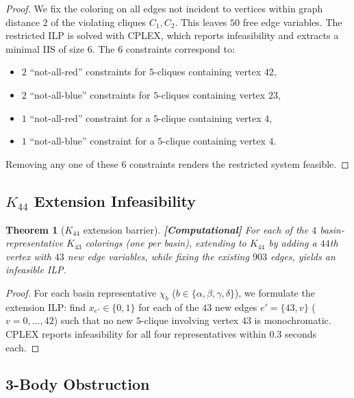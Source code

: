 \documentclass[12pt,a4paper]{article}
\newcommand{\computational}[1]{\textcolor{computational}{\textbf{[Computational]}} #1}
\newtheorem{theorem}{Theorem}[section]
\theoremstyle{definition}
\theoremstyle{remark}
\newcommand{\Kn}[1]{K_{#1}}
\begin{document}
\begin{proof}
We fix the coloring on all edges not incident to vertices within graph distance $2$ of the violating cliques $C_1, C_2$.  This leaves $50$ free edge variables.  The restricted ILP is solved with CPLEX, which reports infeasibility and extracts a minimal IIS of size $6$.  The $6$ constraints correspond to:
\begin{itemize}[nosep]
    \item $2$ ``not-all-red'' constraints for $5$-cliques containing vertex $42$,
    \item $2$ ``not-all-blue'' constraints for $5$-cliques containing vertex $23$,
    \item $1$ ``not-all-red'' constraint for a $5$-clique containing vertex $4$,
    \item $1$ ``not-all-blue'' constraint for a $5$-clique containing vertex $4$.
\end{itemize}
Removing any one of these $6$ constraints renders the restricted system feasible.  \qedhere
\end{proof}

\subsection{$\Kn{44}$ Extension Infeasibility}

\begin{theorem}[$\Kn{44}$ extension barrier]\label{thm:k44}
\computational{For each of the $4$ basin-representative $\Kn{43}$ colorings (one per basin), extending to $\Kn{44}$ by adding a $44$th vertex with $43$ new edge variables, while fixing the existing $903$ edges, yields an infeasible ILP.}
\end{theorem}

\begin{proof}
For each basin representative $\chi_b$ ($b \in \{\alpha, \beta, \gamma, \delta\}$), we formulate the extension ILP: find $x_{e'} \in \{0,1\}$ for each of the $43$ new edges $e' = \{43, v\}$ ($v = 0, \ldots, 42$) such that no new $5$-clique involving vertex $43$ is monochromatic.  CPLEX reports infeasibility for all four representatives within $0.3$ seconds each.
\end{proof}

\subsection{3-Body Obstruction}
\end{document}
